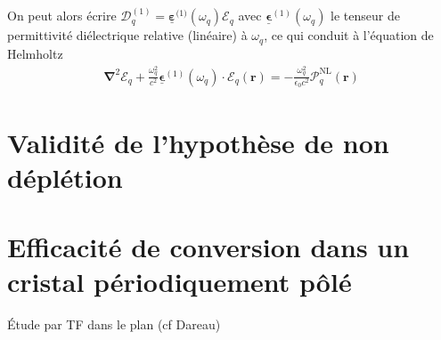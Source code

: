 \documentclass[11pt,a4paper] { article}
\newcommand{\E}{\mathcal{E}}
\newcommand{\mathsc}[1]{\mathrm{\scriptscriptstyle {#1}}}
\renewcommand{\v}[1]{\boldsymbol{\mathbf{#1}}}
\newcommand{\tens}[1]{\boldsymbol{\underline{#1}}}
\begin{document}
On peut alors écrire $\v {\boldsymbol{\mathcal D}}^\mathsc{(1)}_q = \tens \varepsilon^{\mathsc(1)}(\omega_q) \v {\boldsymbol{\mathcal E}}_q$ avec $\tens \epsilon^{(1)}(\omega_q)$ le tenseur de permittivité diélectrique relative (linéaire) à $\omega_q$, ce qui conduit à l'équation de Helmholtz  \citep{boyd}
\begin{align*}
	\boldsymbol{\nabla}^2 \boldsymbol{\E}_q + \frac{\omega_q^2}{c^2}\tens\epsilon^{(1)}(\omega_q)\cdot \v \E_q(\v r) = - \frac{\omega_q^2}{\epsilon_0 c^2} \boldsymbol{\mathcal{P}}^\mathsc{NL}_q(\v r)
\end{align*}

\section{Validité de l'hypothèse de non déplétion}
\label{ndepl}

\section{Efficacité de conversion dans un  cristal périodiquement pôlé}
Étude par TF dans le plan (cf Dareau)
\label{BK}
\end{document}
